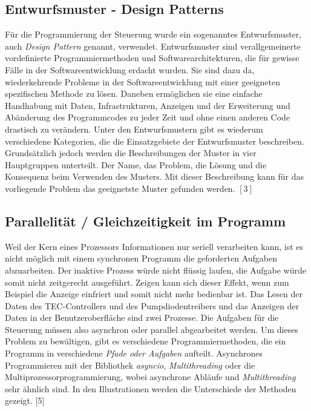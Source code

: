 \subsection{Entwurfsmuster - Design Patterns}
Für die Programmierung der Steuerung wurde ein sogenanntes Entwurfsmuster, auch \textit{Design Pattern} genannt, verwendet. Entwurfsmuster sind verallgemeinerte vordefinierte Programmiermethoden und Softwarearchitekturen, die für gewisse Fälle in der Softwareentwicklung erdacht wurden. Sie sind dazu da, wiederkehrende Probleme in der Softwareentwicklung mit einer geeigneten spezifischen Methode zu lösen. Daneben ermöglichen sie eine einfache Handhabung mit Daten, Infrastrukturen, Anzeigen und der Erweiterung und Abänderung des Programmcodes zu jeder Zeit und ohne einen anderen Code drastisch zu verändern. Unter den Entwurfsmustern gibt es wiederum verschiedene Kategorien, die die Einsatzgebiete der Entwurfsmuster beschreiben. Grundsätzlich jedoch werden die Beschreibungen der Muster in vier Hauptgruppen unterteilt. Der Name, das Problem, die Lösung und die Konsequenz beim Verwenden des Musters. Mit dieser Beschreibung kann für das vorliegende Problem das geeignetste Muster gefunden werden. $[3]$


\subsection{Parallelität / Gleichzeitigkeit im Programm}
\label{concurrency}
Weil der Kern eines Prozessors Informationen nur seriell verarbeiten kann, ist es nicht möglich mit einem synchronen Programm die geforderten Aufgaben abzuarbeiten. Der inaktive Prozess würde nicht flüssig laufen, die Aufgabe würde somit nicht zeitgerecht ausgeführt. Zeigen kann sich dieser Effekt, wenn zum Beispiel die Anzeige einfriert und somit nicht mehr bedienbar ist. Das Lesen der Daten des TEC-Controllers und des Pumpdiodentreibers und das Anzeigen der Daten in der Benutzeroberfläche sind zwei Prozesse. Die Aufgaben für die Steuerung müssen also asynchron oder parallel abgearbeitet werden. Um dieses Problem zu bewältigen, gibt es verschiedene Programmiermethoden, die ein Programm in verschiedene \textit{Pfade oder Aufgaben} aufteilt. Asynchrones Programmieren mit der Bibliothek \textit{asyncio}, \textit{Multithreading} oder die Multiprozessorprogrammierung, wobei asynchrone Abläufe und \textit{Multithreading} sehr ähnlich sind. In den Illustrationen werden die Unterschiede der Methoden gezeigt. [5]\\

